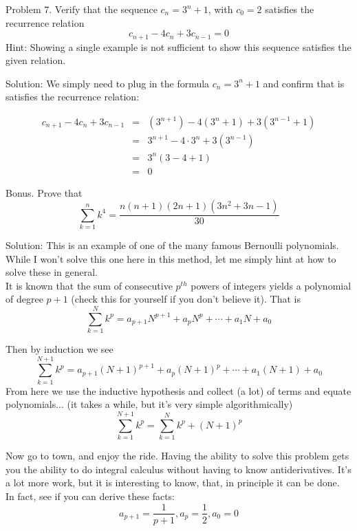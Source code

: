\documentclass[16 pt]{amsart}
\theoremstyle{definition}
\theoremstyle{remark}
\numberwithin{equation}{subsection}
\begin{document}
\newpage

Problem 7.
Verify that the sequence $c_n = 3^n +1$, with $c_0=2$ satisfies the recurrence relation
\[
c_{n+1} - 4 c_n + 3c_{n-1}=0
\]
Hint: Showing a single example is not sufficient to show this sequence satisfies the given relation.

\vspace{1in}

Solution: We simply need to plug in the formula $c_n=3^n+1$ and confirm that is satisfies the recurrence relation:

\begin{eqnarray*}
c_{n+1} - 4c_n + 3c_{n-1} &  = & (3^{n+1})-4(3^n+1) + 3(3^{n-1}+1)\\
& = & 3^{n+1} - 4\cdot 3^n + 3(3^{n-1})\\
& = & 3^{n}(3-4+1)\\
& = & 0
\end{eqnarray*}

\newpage
Bonus.
Prove that 
\[
\sum_{k=1}^{n} k^4 = \frac{n(n+1)(2n+1)(3n^2+3n-1)}{30}
\]

\vspace{1in}

Solution:  This is an example of one of the many famous Bernoulli polynomials.  While I won't solve this one here in this method, let me simply hint at how to solve these in general.\\

It is known that the sum of consecutive $p^{th}$ powers of integers yields a polynomial of degree $p+1$ (check this for yourself if you don't believe it). That is
\[
\sum_{k=1}^{N} k^p = a_{p+1}N^{p+1} + a_{p}N^p + \cdots + a_1 N + a_0  
\]

Then by induction we see
\[
\sum_{k=1}^{N+1} k^p = a_{p+1}(N+1)^{p+1} + a_{p}(N+1)^p + \cdots + a_1 (N+1) + a_0
\]
From here we use the inductive hypothesis and collect (a lot) of terms and equate polynomials... (it takes a while, but it's very simple algorithmically)
\[
\sum_{k=1}^{N+1} k^p = \sum_{k=1}^{N} k^p + (N+1)^p
\]

Now go to town, and enjoy the ride.  Having the ability to solve this problem gets you the ability to do integral calculus without having to know antiderivatives.  It's a lot more work, but it is interesting to know, that, in principle it can be done.\\

In fact, see if you can derive these facts:
\[
a_{p+1} = \frac{1}{p+1}, a_p = \frac{1}{2}, a_0 = 0
\]
\end{document}
